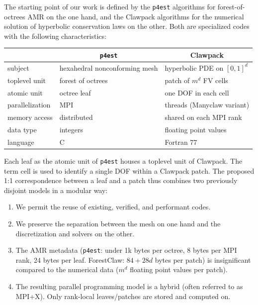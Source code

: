 \documentclass{IOS-Book-Article}     %
\newcommand{\comment}[1]{\textcolor{green}{[DAC: #1]}\xspace}
\newcommand{\clawpack}{{\sc Clawpack}\xspace}
\newcommand{\forestclaw}{ForestClaw\xspace}
\newcommand{\pforest}{\texttt{p4est}\xspace}
\newcommand{\manyclaw}{Manyclaw\xspace}
\begin{document}
The starting point of our work is defined by the \pforest algorithms for
forest-of-octrees AMR on the one hand, and the \clawpack algorithms for the
numerical solution of hyperbolic conservation laws
on the other.  Both are specialized codes with the following characteristics:
\begin{center}
\begin{tabular}{l|l|l}
& \multicolumn{1}{c|}{\pforest} & \multicolumn{1}{c}{\clawpack} \\
\hline
subject & hexahedral nonconforming mesh &  hyperbolic PDE on $[0, 1]^d$ \\
toplevel unit & forest of octrees & patch of $m^d$ FV cells \\
atomic unit & octree leaf & one DOF in each cell \\
parallelization & MPI & threads (\manyclaw variant) \\
memory access & distributed & shared on each MPI rank \\
data type & integers & floating point values \\
language & C & Fortran 77 \\
\end{tabular}
\end{center}
Each leaf as the atomic unit of \pforest houses a toplevel unit of \clawpack.
The term cell is used to identify a single DOF within a \clawpack patch.  The
proposed 1:1 correspondence between a leaf and a patch thus combines two
previously disjoint models in a modular way:
\begin{enumerate}
\item We permit the reuse of existing, verified, and performant codes.
\item We preserve the separation between the mesh on one hand and the
discretization and solvers on the other.
\item The AMR metadata (\pforest:
under 1k bytes per octree, 8 bytes per MPI rank,
24 bytes per leaf. \forestclaw: $84 + 28d$ bytes per patch)
is insignificant compared to
the numerical data ($m^d$ floating point values per patch).

\item The resulting parallel programming model is a hybrid (often referred
to as MPI+X).  Only rank-local leaves/patches are stored and computed on.
\end{enumerate}
\end{document}
